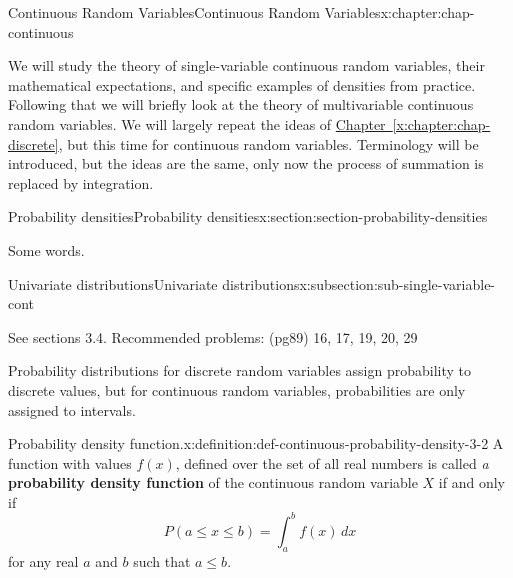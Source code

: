 \documentclass[oneside,10pt,]{book}
\newcommand{\xreffont}{\relax}
\newcommand{\terminology}[1]{\textbf{#1}}
\numberwithin{equation}{section}
\begin{document}
\begin{chapterptx}{Continuous Random Variables}{}{Continuous Random Variables}{}{}{x:chapter:chap-continuous}
\begin{introduction}{}%
We will study the theory of single-variable continuous random variables, their mathematical expectations, and specific examples of densities from practice.  Following that we will briefly look at the theory of multivariable continuous random variables. We will largely repeat the ideas of \hyperref[x:chapter:chap-discrete]{Chapter~{\xreffont\ref{x:chapter:chap-discrete}}}, but this time for continuous random variables.  Terminology will be introduced, but the ideas are the same, only now the process of summation is replaced by integration.%
\end{introduction}%
%
%
\typeout{************************************************}
\typeout{************************************************}
%
\begin{sectionptx}{Probability densities}{}{Probability densities}{}{}{x:section:section-probability-densities}
\begin{introduction}{}%
Some words.%
\end{introduction}%
%
%
\typeout{************************************************}
\typeout{************************************************}
%
\begin{subsectionptx}{Univariate distributions}{}{Univariate distributions}{}{}{x:subsection:sub-single-variable-cont}
\begin{introduction}{}%
See sections 3.4. Recommended problems: (pg89) 16, 17, 19, 20, 29\textasteriskcentered{}%
\par
Probability distributions for discrete random variables assign probability to discrete values, but for continuous random variables, probabilities are only assigned to intervals.%
\end{introduction}%
\begin{definition}{Probability density function.}{x:definition:def-continuous-probability-density-3-2}%
A function with values \(f(x)\), defined over the set of all real numbers is called \emph{a} \terminology{probability density function} of the continuous random variable \(X\) if and only if%
\begin{equation*}
P(a \le x \le b) = \int_a^b f(x)\,dx
\end{equation*}
for any real \(a\) and \(b\) such that \(a \le b\).%
\end{definition}

\end{subsectionptx}
\end{sectionptx}
\end{chapterptx}
\end{document}
